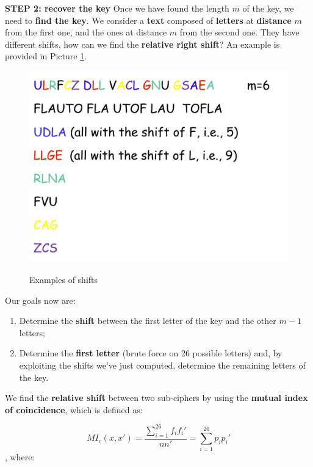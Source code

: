 \textbf{STEP 2: recover the key}
Once we have found the length $m$ of the key, we need to \textbf{find the key}. We consider a \textbf{text} composed of \textbf{letters} at \textbf{distance} $m$ from the first one, and the ones at distance $m$ from the second one. They have different shifts, how can we find the \textbf{relative right shift}? An example is provided in Picture \ref{poly3}.

\begin{figure}[h!]
        \centering
        \includegraphics[scale = 0.75]{img/poly3.jpg}
        \label{poly3}
        \caption{Examples of shifts}
\end{figure}

Our goals now are:

\begin{enumerate}
    \item Determine the \textbf{shift} between the first letter of the key and the other $m-1$ letters;
    \item Determine the \textbf{first letter} (brute force on 26 possible letters) and, by exploiting the shifts we've just computed, determine the remaining letters of the key.
\end{enumerate}

We find the \textbf{relative shift} between two sub-ciphers by using the \textbf{mutual index of coincidence}, which is defined as:

$$
MI_c (x,x') = \frac{\sum_{i = 1}^{26} f_i f_i'}{n n'} = \sum_{i = 1}^{26} p_i p_i'
$$
, where:

